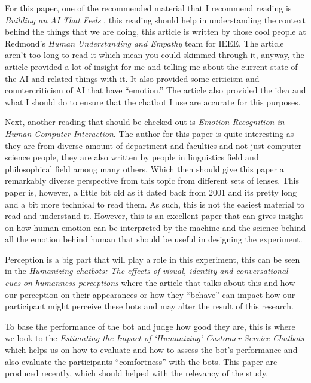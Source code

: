 \documentclass{vgtc}
\begin{document}
For this paper, one of the recommended material that I recommend reading
is \emph{Building an AI That Feels} \cite{czerwinski_hernandez_mcduff_2021}, this reading should help in
understanding the context behind the things that we are doing, this
article is written by those cool people at Redmond's \emph{Human
Understanding and Empathy} team for IEEE. The article aren't too long to
read it which mean you could skimmed through it, anyway, the article
provided a lot of insight for me and telling me about the current state
of the AI and related things with it. It also provided some criticism
and countercriticism of AI that have ``emotion.'' The article also
provided the idea and what I should do to ensure that the chatbot I use
are accurate for this purposes.


Next, another reading that should be checked out is \emph{Emotion
Recognition in Human-Computer Interaction}\cite{911197}. The author for this
paper is quite interesting as they are from diverse amount of department
and faculties and not just computer science people, they are also
written by people in linguistics field and philosophical field among
many others. Which then should give this paper a remarkably diverse
perspective from this topic from different sets of lenses. This paper
is, however, a little bit old as it dated back from 2001 and its pretty
long and a bit more technical to read them. As such, this is not the
easiest material to read and understand it. However, this is an
excellent paper that can gives insight on how human emotion can be
interpreted by the machine and the science behind all the emotion behind
human that should be useful in designing the experiment.

Perception is a big part that will play a role in this experiment, this
can be seen in the \emph{Humanizing chatbots: The effects of visual,
identity and conversational cues} \emph{on humanness perceptions}
\cite{GO2019304} where the article that talks about this and how our perception
on their appearances or how they ``behave'' can impact how our
participant might perceive these bots and may alter the result of this
research.

To base the performance of the bot and judge how good they are, this is
where we look to the \emph{Estimating the Impact of `Humanizing'
Customer Service Chatbots} \cite{doi:10.1287/isre.2021.1015} which helps us on how to evaluate and
how to assess the bot's performance and also evaluate the participants
``comfortness'' with the bots. This paper are produced recently, which
should helped with the relevancy of the study.
\end{document}
